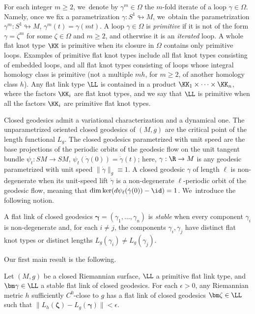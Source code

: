 For each integer $m\geq2$, we~denote by $\gamma^m\in\Omega$ the $m$-fold iterate of a loop $\gamma\in\Omega$. Namely, once we fix a parametrization $\gamma:S^1\looparrowright M$, we~obtain the parametrization $\gamma^m:S^1\looparrowright M$, $\gamma^m(t)=\gamma(mt)$.
A loop $\gamma\in\Omega$ is \emph{primitive} if it is not of the form $\gamma=\zeta^m$ for some $\zeta\in\Omega$ and $m\geq2$, and otherwise it is an \emph{iterated} loop.
A whole flat knot type $\KK$ is primitive when its closure in $\Omega$ contains only primitive loops. Examples of primitive flat knot types include all flat knot types consisting of embedded loops, and all flat knot types consisting of loops whose integral homology class is primitive (\ie not a multiple $mh$, for $m\geq2$, of another homology class $h$). Any flat link type $\LL$ is contained in a product $\KK_1\times\cdots\times\KK_n$, where the factors $\KK_i$ are flat knot types, and we say that $\LL$ is primitive when all the factors $\KK_i$ are primitive flat knot types.

Closed geodesics admit a variational characterization and a dynamical one. The unparametrized oriented closed geodesics of $(M,g)$ are the critical point of the length functional $L_g$. The closed geodesics parametrized with unit speed are the base projections of the periodic orbits of the geodesic flow on the unit tangent bundle \hbox{$\psi_t:SM\to SM$}, $\psi_t(\dot\gamma(0))=\dot\gamma(t)$; here, $\gamma:\R\to M$ is any geodesic parametrized with unit speed $\|\dot\gamma\|_g\equiv1$. A closed geodesic $\gamma$ of length $\ell$ is non-degenerate when its unit-speed lift $\dot\gamma$ is a non-degenerate $\ell$-periodic orbit of the geodesic flow, meaning that $\dim\ker(d\psi_\ell(\dot\gamma(0))-\id)=1$. We~introduce the following notion.

\begin{Definition}\label{d:stable_link}
A flat link of closed geodesics $\bm\gamma=(\gamma_1,\dots,\gamma_n)$ is \emph{stable} when every component $\gamma_i$ is non-degenerate and, for each $i\neq j$, the components $\gamma_i,\gamma_j$ have distinct flat knot types or distinct lengths $L_g(\gamma_i)\neq L_g(\gamma_j)$.\end{Definition}

Our first main result is the following.

\begin{MainThm}\label{mt:links}
Let $(M,g)$ be a closed Riemannian surface, $\LL$ a primitive flat link type, and $\bm\gamma\in\LL$ a stable flat link of closed geodesics. For each $\epsilon>0$, any Riemannian metric $h$ sufficiently $C^0$-close to $g$ has a flat link of closed geodesics $\bm\zeta\in\LL$ such that $\|L_h(\bm\zeta)- L_g(\bm\gamma)\|<\epsilon$.
\end{MainThm}


